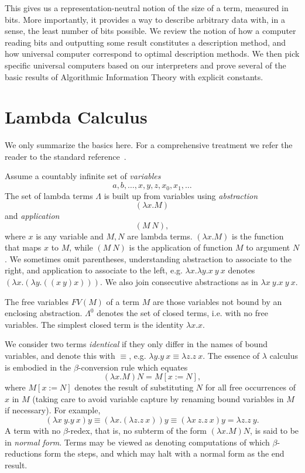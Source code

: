 \documentclass{article}
\begin{document}
This gives us a representation-neutral notion of the size of a term,
measured in bits.
More importantly, it provides a way to describe arbitrary
data with, in a sense, the least number of bits possible.
We review the notion of how a computer reading bits and outputting
some result constitutes a description method, and how universal computer
correspond to optimal description methods.
We then pick specific universal computers based on our interpreters
and prove several of the basic results of Algorithmic Information Theory
with explicit constants.

\section{Lambda Calculus}
We only summarize the basics here. For a comprehensive treatment
we refer the reader to the standard reference~\cite{b}.

Assume a countably infinite set of {\em variables}
\[a,b,\ldots,x,y,z,x_0,x_1,\ldots\]
The set of lambda terms $\Lambda$ is built up from variables
using {\em abstraction} \[ (\lambda x.M) \]
and {\em application} \[ (M\ N), \]
where $x$ is any variable and $M,N$ are lambda terms.
$(\lambda x.M)$ is the function that maps $x$ to $M$,
while $(M\ N)$ is the application of function $M$ to argument $N$.
We sometimes omit parentheses, understanding abstraction to associate to
the right, and application to associate to the left, e.g.
$\lambda x.\lambda y.x\ y\ x$ denotes $(\lambda x.(\lambda y.((x\ y)x)))$.
We also join consecutive abstractions as in $\lambda x\ y.x\ y\ x$.

The free variables $FV(M)$ of a term $M$ are those variables not bound
by an enclosing abstraction. $\Lambda^0$ denotes the set of closed terms,
i.e. with no free variables. The simplest closed term is the identity
$\lambda x.x$.

We consider two terms {\em identical} if they only differ in the names
of bound variables, and denote this with $\equiv$, e.g.
$\lambda y.y\ x \equiv \lambda z.z\ x$.
The essence of $\lambda$ calculus is embodied in
the $\beta$-conversion rule which equates
\[(\lambda x.M)N = M[x:=N],\] where $M[x:=N]$ denotes the result
of substituting $N$ for all free occurrences of $x$ in $M$ (taking care
to avoid variable capture by renaming bound variables in $M$ if necessary).
For example,
\[(\lambda x\ y.y\ x)y \equiv (\lambda x.(\lambda z.z\ x))y
\equiv (\lambda x\ z.z\ x)y = \lambda z.z\ y.\]
A term with no $\beta$-redex, that is, no subterm of the form $(\lambda x.M)N$,
is said to be in {\em normal form}. Terms may be viewed as
denoting computations of which $\beta$-reductions form the steps,
and which may halt with a normal form as the end result.
\end{document}
